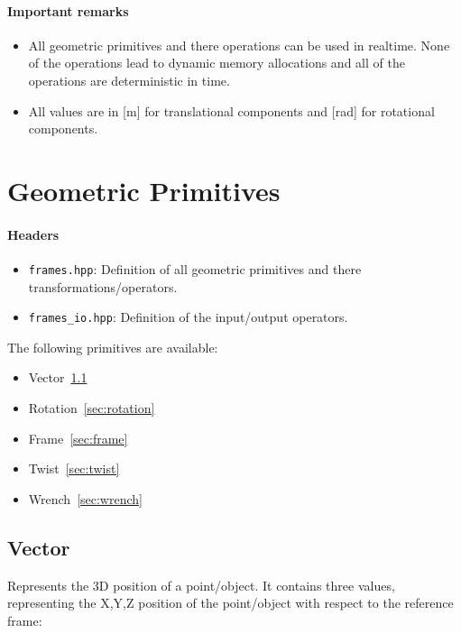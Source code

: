 \documentclass[a4paper,10pt]{report}
\begin{document}
\paragraph{Important remarks}
\label{sec:important-remarks}
\begin{itemize}
\item All geometric primitives and there operations can be used in
  realtime. None of the operations lead to dynamic memory allocations
  and all of the operations are deterministic in time.
\item All values are in [m] for translational components and [rad] for
  rotational components.
\end{itemize}

\section{Geometric Primitives}
\label{sec:geometric-primitives}

\paragraph{Headers}
\label{sec:headers}

\begin{itemize}
\item \lstinline$frames.hpp$: Definition of all geometric primitives
  and there transformations/operators.
\item \lstinline$frames_io.hpp$: Definition of the input/output
  operators.
\end{itemize}


The following primitives are available:
\begin{itemize}
\item Vector~\ref{sec:vector}
\item Rotation~\ref{sec:rotation}
\item Frame~\ref{sec:frame}
\item Twist~\ref{sec:twist}
\item Wrench~\ref{sec:wrench}
\end{itemize}

\subsection{Vector}
\label{sec:vector}
Represents the 3D position of a point/object. It contains
three values, representing the X,Y,Z position of the point/object with
respect to the reference frame:
\end{document}
